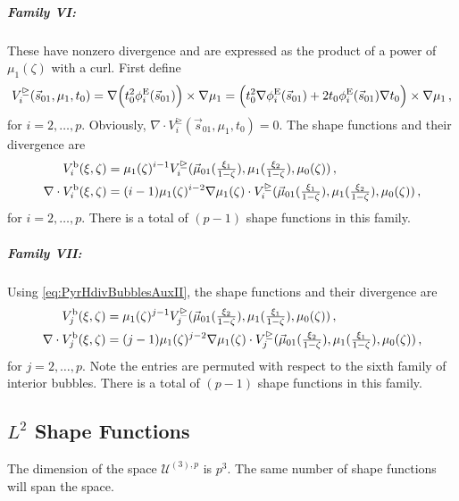 \subparagraph{Family VI:}
These have nonzero divergence and are expressed as the product of a power of $\mu_1(\zeta)$ with a curl.
First define
\begin{equation}
		V_i^\trianglerighteq(\vec{s}_{01},\mu_1,t_0)=
			\nabla\Big(t_0^2\phi_i^{\mathrm{E}}(\vec{s}_{01})\Big)\times\nabla\mu_1
				=\Big(t_0^2\nabla\phi_i^{\mathrm{E}}(\vec{s}_{01})+2t_0\phi_i^{\mathrm{E}}(\vec{s}_{01})\nabla t_0\Big)\times\nabla\mu_1\,,
	\label{eq:PyrHdivBubblesAuxII}
\end{equation}
for $i=2,\ldots,p$.
Obviously, $\nabla\cdot V_i^\trianglerighteq(\vec{s}_{01},\mu_1,t_0)=0$.
The shape functions and their divergence are
\begin{equation}
	\begin{aligned}
		V_{i}^{\mathrm{b}}(\xi,\zeta)&=\mu_1(\zeta)^{i-1}V_i^\trianglerighteq(\vec{\mu}_{01}(\textstyle{\frac{\xi_1}{1-\zeta}}),\mu_1(\textstyle{\frac{\xi_2}{1-\zeta}}),\mu_0(\zeta))\,,\\
		\nabla\cdot	V_{i}^{\mathrm{b}}(\xi,\zeta)&=(i-1)\mu_1(\zeta)^{i-2}\nabla\mu_1(\zeta)
			\cdot V_i^\trianglerighteq(\vec{\mu}_{01}(\textstyle{\frac{\xi_1}{1-\zeta}}),\mu_1(\textstyle{\frac{\xi_2}{1-\zeta}}),\mu_0(\zeta))\,,
	\end{aligned}
	\label{eq:PyrHdivInteriorVI}
\end{equation}
for $i=2,\ldots,p$. 
There is a total of $(p-1)$ shape functions in this family.

\subparagraph{Family VII:}
Using \eqref{eq:PyrHdivBubblesAuxII}, the shape functions and their divergence are
\begin{equation}
	\begin{aligned}
		V_{j}^{\mathrm{b}}(\xi,\zeta)&=\mu_1(\zeta)^{j-1}V_j^\trianglerighteq(\vec{\mu}_{01}(\textstyle{\frac{\xi_2}{1-\zeta}}),\mu_1(\textstyle{\frac{\xi_1}{1-\zeta}}),\mu_0(\zeta))\,,\\
		\nabla\cdot	V_{j}^{\mathrm{b}}(\xi,\zeta)&=(j-1)\mu_1(\zeta)^{j-2}\nabla\mu_1(\zeta)
			\cdot V_j^\trianglerighteq(\vec{\mu}_{01}(\textstyle{\frac{\xi_2}{1-\zeta}}),\mu_1(\textstyle{\frac{\xi_1}{1-\zeta}}),\mu_0(\zeta))\,,
	\end{aligned}
	\label{eq:PyrHdivInteriorVII}
\end{equation}
for $j=2,\ldots,p$.
Note the entries are permuted with respect to the sixth family of interior bubbles.
There is a total of $(p-1)$ shape functions in this family.


\subsection{\texorpdfstring{$L^2$}{L2} Shape Functions}

The dimension of the space $\mathcal{U}^{(3),p}$ is $p^3$.
The same number of shape functions will span the space.

